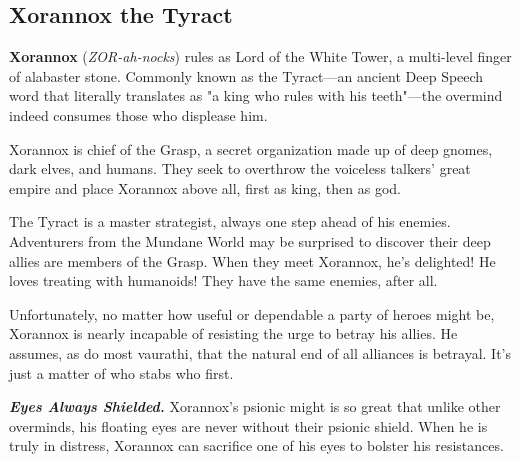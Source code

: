 \documentclass[10pt,a4paper,twoside,fancy,bg=print,twocolumn,openany,nodeprecatedcode]{dndbook}
\begin{document}
\subsection{Xorannox the Tyract}

\textbf{Xorannox} (\textit{ZOR-ah-nocks}) rules as Lord of the White Tower, a multi-level finger of alabaster stone. Commonly known as the Tyract—an ancient Deep Speech word that literally translates as "a king who rules with his teeth"—the overmind indeed consumes those who displease him.

Xorannox is chief of the Grasp, a secret organization made up of deep gnomes, dark elves, and humans. They seek to overthrow the voiceless talkers' great empire and place Xorannox above all, first as king, then as god.

The Tyract is a master strategist, always one step ahead of his enemies. Adventurers from the Mundane World may be surprised to discover their deep allies are members of the Grasp. When they meet Xorannox, he's delighted! He loves treating with humanoids! They have the same enemies, after all.

Unfortunately, no matter how useful or dependable a party of heroes might be, Xorannox is nearly incapable of resisting the urge to betray his allies. He assumes, as do most vaurathi, that the natural end of all alliances is betrayal. It's just a matter of who stabs who first.

\textbf{\textit{Eyes Always Shielded.}} Xorannox's psionic might is so great that unlike other overminds, his floating eyes are never without their psionic shield. When he is truly in distress, Xorannox can sacrifice one of his eyes to bolster his resistances.

\end{document}
